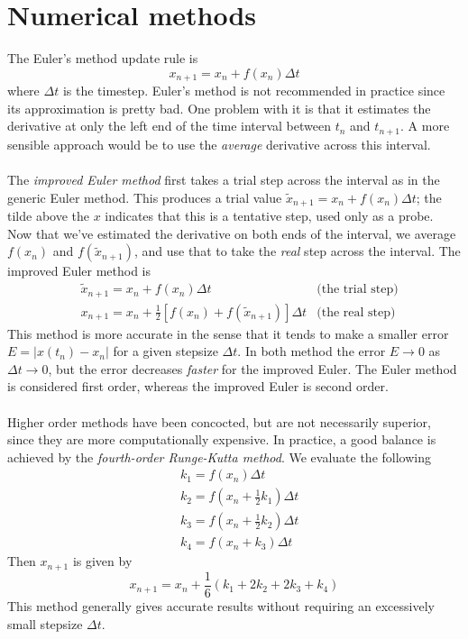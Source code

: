 \documentclass{report}
\theoremstyle{definition}
\begin{document}
\section{Numerical methods}
The Euler's method update rule is
\begin{equation*}
x_{n+1}=x_n+f(x_n)\Delta t
\end{equation*}
where $\Delta t$ is the timestep. Euler's method is not recommended in practice since its approximation is pretty bad. One problem with it is that it estimates the derivative at only the left end
of the time interval between $t_n$ and $t_{n+1}$. A more sensible approach would be to use the 
\textit{average} derivative across this interval.\\
\vspace{1mm}\\
The \textit{improved Euler method} first takes a trial step across the interval as in the generic Euler method. This produces a trial value $\tilde x_{n+1}=x_n+f(x_n)\Delta t$;
the tilde above the $x$ indicates that this is a tentative step, used only as a probe. Now that we've estimated the derivative on both ends of the interval, we average
$f(x_n)$ and $f(\tilde x_{n+1})$, and use that to take the \textit{real} step across the interval.
The improved Euler method is
\begin{align*}
&\tilde x_{n+1}=x_n+f(x_n)\Delta t&\text{(the trial step)}\\
&x_{n+1}=x_n+\frac{1}{2}[f(x_n)+f(\tilde x_{n+1})]\Delta t&\text{(the real step)}
\end{align*}
This method is more accurate in the sense that it tends to make a smaller error $E=|x(t_n)-x_n|$ for a given stepsize $\Delta t$. In both method the error $E\to0$ as $\Delta t\to0$, but the error
decreases \textit{faster} for the improved Euler. The Euler method is considered first order, whereas the improved Euler is second order.\\
\vspace{1mm}\\
Higher order methods have been concocted, but are not necessarily superior, since they are more computationally expensive. In practice, a good balance is achieved by the 
\textit{fourth-order Runge-Kutta method}. We evaluate the following 
\begin{align*}
&k_1=f(x_n)\Delta t\\
&k_2=f(x_n+\frac{1}{2}k_1)\Delta t\\
&k_3=f(x_n+\frac{1}{2}k_2)\Delta t\\
&k_4=f(x_n+k_3)\Delta t
\end{align*}
Then $x_{n+1}$ is given by
\begin{equation*}
x_{n+1}=x_n+\frac{1}{6}(k_1+2k_2+2k_3+k_4)
\end{equation*}
This method generally gives accurate results without requiring an excessively small stepsize $\Delta t$.
\newpage
\end{document}
